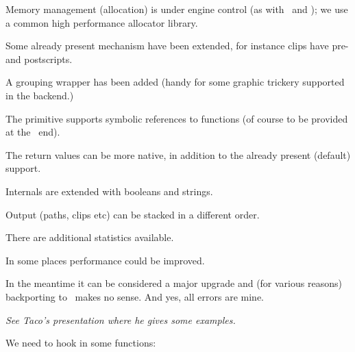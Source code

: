 \startitem
    Memory management (allocation) is under engine control (as with \TEX\ and \LUA);
    we use a common high performance allocator library.
\stopitem

\stopitemize

\stoptitle

\starttitle[title=The (\LUAMETATEX) library]

\startitemize

\startitem
    Some already present mechanism have been extended, for instance clips have
    pre- and postscripts.
\stopitem

\startitem
    A grouping wrapper has been added (handy for some graphic trickery supported in the
    backend.)
\stopitem

\startitem
    The  primitive supports symbolic references to functions (of course to
    be provided at the \LUA\ end).
\stopitem

\startitem
    The  return values can be more native, in addition to the already
    present (default)  support.
\stopitem

\startitem
    Internals are extended with booleans and strings.
\stopitem

\startitem
    Output (paths, clips etc) can be stacked in a different order.
\stopitem

\startitem
    There are additional statistics available.
\stopitem

\startitem
    In some places performance could be improved.
\stopitem

\startitem
    In the meantime it can be considered a major upgrade and (for various
    reasons) backporting to \LUATEX\ makes no sense. And yes, all errors are
    mine.
\stopitem

\stopitemize

\starttitle[title=The \LUA fication]

    {\em See Taco's presentation where he gives some examples.}

\stoptitle

\starttitle[title=Callbacks]

We need to hook in some functions: \blank[2*big]

